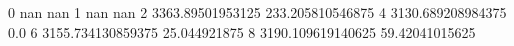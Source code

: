 0 nan nan
1 nan nan
2 3363.89501953125 233.205810546875
4 3130.689208984375 0.0
6 3155.734130859375 25.044921875
8 3190.109619140625 59.42041015625
